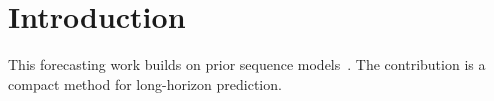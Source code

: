 \section{Introduction}
This forecasting work builds on prior sequence models~\cite{vaswani2017}.
The contribution is a compact method for long-horizon prediction.
